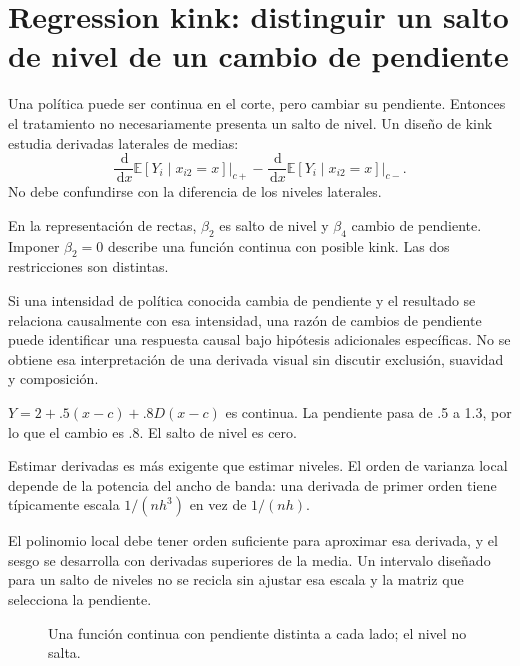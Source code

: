\documentclass[11pt,a4paper]{article}
\newcommand{\E}{\mathbb E}
\newcommand{\dd}{\,\mathrm d}
\begin{document}
\clearpage
\section{Regression kink: distinguir un salto de nivel de un cambio de pendiente}\label{unidad47}
Una política puede ser continua en el corte,
pero cambiar su pendiente.
Entonces el tratamiento no necesariamente
presenta un salto de nivel.
Un diseño de kink estudia
derivadas laterales de medias:
\[
\frac{\dd}{\dd x}\E[Y_i\mid x_{i2}=x]\bigg|_{c+}
-
\frac{\dd}{\dd x}\E[Y_i\mid x_{i2}=x]\bigg|_{c-}.
\]
No debe confundirse con la diferencia
de los niveles laterales.

En la representación de rectas,
\(\beta_2\) es salto de nivel
y \(\beta_4\) cambio de pendiente.
Imponer \(\beta_2=0\) describe
una función continua con posible kink.
Las dos restricciones son distintas.

Si una intensidad de política conocida
cambia de pendiente y el resultado
se relaciona causalmente con esa intensidad,
una razón de cambios de pendiente
puede identificar una respuesta causal
bajo hipótesis adicionales específicas.
No se obtiene esa interpretación
de una derivada visual sin discutir
exclusión, suavidad y composición.

\begin{ejemplo}
\(Y=2+.5(x-c)+.8D(x-c)\) es continua.
La pendiente pasa de .5 a 1.3,
por lo que el cambio es .8.
El salto de nivel es cero.
\end{ejemplo}
Estimar derivadas es más exigente
que estimar niveles.
El orden de varianza local depende
de la potencia del ancho de banda:
una derivada de primer orden
tiene típicamente escala \(1/(nh^3)\)
en vez de \(1/(nh)\).

El polinomio local debe tener orden
suficiente para aproximar esa derivada,
y el sesgo se desarrolla con
derivadas superiores de la media.
Un intervalo diseñado para un salto
de niveles no se recicla sin
ajustar esa escala y la matriz
que selecciona la pendiente.

\begin{figure}[H]\centering
{}
\caption{Una función continua con pendiente distinta a cada lado; el nivel no salta.}
\end{figure}
\end{document}
